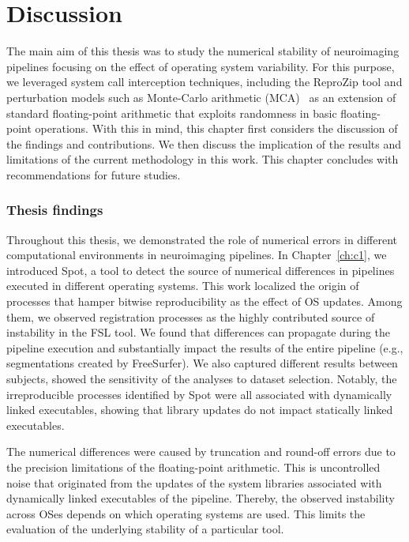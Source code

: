 \chapter{Discussion}
\label{ch:discussion}

The main aim of this thesis was to study the numerical stability of neuroimaging pipelines focusing on the effect
of operating system variability. For this purpose, we leveraged system call interception techniques, including
the ReproZip tool and perturbation models such as Monte-Carlo arithmetic (MCA)~\cite{Parker1997-qq} as an extension of
standard floating-point arithmetic that exploits randomness in basic floating-point operations. 
With this in mind, this chapter first considers the discussion of the findings and contributions.
We then discuss the implication of the results and limitations of the current methodology in this work.
This chapter concludes with recommendations for future studies.


\subsection{Thesis findings}

Throughout this thesis, we demonstrated the role of numerical errors in different computational environments in neuroimaging pipelines.
In Chapter~\ref{ch:c1}, we introduced Spot, a tool to detect the source of numerical differences in pipelines
executed in different operating systems. 
This work localized the origin of processes that hamper bitwise reproducibility as the effect of OS updates.
Among them, we observed registration processes as the highly contributed source of instability in the FSL tool. 
We found that differences can propagate during the pipeline execution and substantially impact
the results of the entire pipeline (e.g., segmentations created by FreeSurfer).
We also captured different results between subjects, showed the sensitivity of the analyses to dataset selection.
Notably, the irreproducible processes identified by Spot were all associated with dynamically linked executables,
showing that library updates do not impact statically linked executables.


The numerical differences were caused by truncation and round-off errors
due to the precision limitations of the floating-point arithmetic.
This is uncontrolled noise that originated from the updates of the system libraries associated with
dynamically linked executables of the pipeline. Thereby, the observed instability across OSes
depends on which operating systems are used. This limits the evaluation of the underlying stability of a particular tool.

